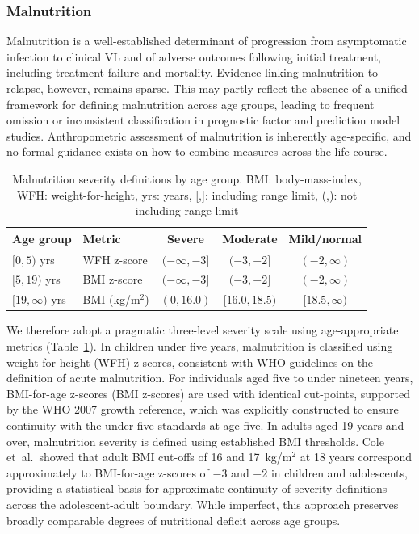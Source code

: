 \subsubsection{\label{sec:malnutrition}Malnutrition}

Malnutrition is a well-established determinant of progression from asymptomatic infection to clinical VL and of adverse outcomes following initial treatment, including treatment failure and mortality\cite{pareyn2025,abongomera2020}. Evidence linking malnutrition to relapse, however, remains sparse. This may partly reflect the absence of a unified framework for defining malnutrition across age groups, leading to frequent omission or inconsistent classification in prognostic factor and prediction model studies. Anthropometric assessment of malnutrition is inherently age-specific, and no formal guidance exists on how to combine measures across the life course.

\begin{table}[tb]
  \centering
  \caption{Malnutrition severity definitions by age group. BMI: body-mass-index, WFH: weight-for-height, yrs: years, [,]: including range limit, (,): not including range limit}
  \label{tab:malnutrition}
  \begin{tabular}{llccc}
    \toprule
    \textbf{Age group} & \textbf{Metric} & \textbf{Severe} & \textbf{Moderate} & \textbf{Mild/normal} \\
    \midrule
    $[0,5)$ yrs        & WFH z-score     & $(-\infty, -3]$ & $(-3,-2]$         & $(-2, \infty)$       \\
    $[5,19)$ yrs       & BMI z-score     & $(-\infty, -3]$ & $(-3,-2]$         & $(-2, \infty)$       \\
    $[19, \infty)$ yrs & BMI (kg/m$^2$)  & $(0, 16.0)$     & $[16.0, 18.5)$    & $[18.5, \infty)$     \\
    \bottomrule
  \end{tabular}
\end{table}

We therefore adopt a pragmatic three-level severity scale using age-appropriate metrics (Table~\ref{tab:malnutrition}). In children under five years, malnutrition is classified using weight-for-height (WFH) z-scores, consistent with WHO guidelines on the definition of acute malnutrition\cite{WHO-nutrition-2023}. For individuals aged five to under nineteen years, BMI-for-age z-scores (BMI z-scores) are used with identical cut-points, supported by the WHO 2007 growth reference, which was explicitly constructed to ensure continuity with the under-five standards at age five\cite{deonis2007}. In adults aged 19 years and over, malnutrition severity is defined using established BMI thresholds. Cole et~al.\ showed that adult BMI cut-offs of 16 and 17~kg/m$^2$ at 18 years correspond approximately to BMI-for-age z-scores of $-3$ and $-2$ in children and adolescents, providing a statistical basis for approximate continuity of severity definitions across the adolescent-adult boundary\cite{cole2007}. While imperfect, this approach preserves broadly comparable degrees of nutritional deficit across age groups.

